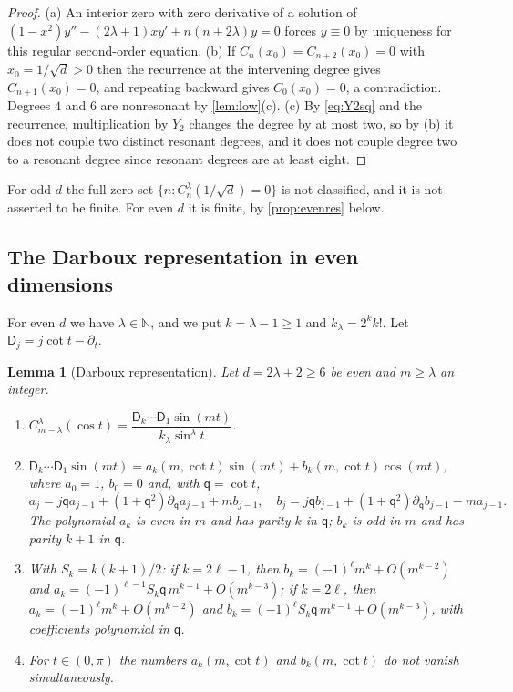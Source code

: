 \documentclass[11pt]{amsart}
\numberwithin{equation}{section}
\newtheorem{lemma}[theorem]{Lemma}
\theoremstyle{definition}
\theoremstyle{remark}
\newcommand{\N}{\mathbb{N}}
\begin{document}
\begin{proof}
(a) An interior zero with zero derivative of a solution of $(1-x^2)y''-(2\lambda+1)xy'+n(n+2\lambda)y=0$ forces $y\equiv0$ by uniqueness for this regular second-order equation. (b) If $C_n(x_0)=C_{n+2}(x_0)=0$ with $x_0=1/\sqrt d>0$ then the recurrence at the intervening degree gives $C_{n+1}(x_0)=0$, and repeating backward gives $C_0(x_0)=0$, a contradiction. Degrees $4$ and $6$ are nonresonant by \cref{lem:low}(c). (c) By \eqref{eq:Y2sq} and the recurrence, multiplication by $Y_2$ changes the degree by at most two, so by (b) it does not couple two distinct resonant degrees, and it does not couple degree two to a resonant degree since resonant degrees are at least eight.
\end{proof}

For odd $d$ the full zero set $\{n:C_n^\lambda(1/\sqrt d)=0\}$ is not classified, and it is not asserted to be finite. For even $d$ it is finite, by \cref{prop:evenres} below.

\subsection{The Darboux representation in even dimensions}
For even $d$ we have $\lambda\in\N$, and we put $k=\lambda-1\ge1$ and $k_\lambda=2^kk!$. Let $\mathsf D_j=j\cot t-\partial_t$.

\begin{lemma}[Darboux representation]\label{lem:darboux}
Let $d=2\lambda+2\ge6$ be even and $m\ge\lambda$ an integer.
\begin{enumerate}[label=\textup{(\alph*)}]
\item $C^\lambda_{m-\lambda}(\cos t)=\dfrac{\mathsf D_k\cdots\mathsf D_1\sin(mt)}{k_\lambda\sin^\lambda t}$.
\item $\mathsf D_k\cdots\mathsf D_1\sin(mt)=a_k(m,\cot t)\sin(mt)+b_k(m,\cot t)\cos(mt)$, where $a_0=1$, $b_0=0$ and, with $\mathsf q=\cot t$,
\begin{equation}\label{eq:abrec}
a_j=j\mathsf qa_{j-1}+(1+\mathsf q^2)\partial_{\mathsf q}a_{j-1}+mb_{j-1},\quad b_j=j\mathsf qb_{j-1}+(1+\mathsf q^2)\partial_{\mathsf q}b_{j-1}-ma_{j-1}.
\end{equation}
The polynomial $a_k$ is even in $m$ and has parity $k$ in $\mathsf q$; $b_k$ is odd in $m$ and has parity $k+1$ in $\mathsf q$.
\item With $S_k=k(k+1)/2$: if $k=2\ell-1$, then $b_k=(-1)^\ell m^k+O(m^{k-2})$ and $a_k=(-1)^{\ell-1}S_k\mathsf q\,m^{k-1}+O(m^{k-3})$; if $k=2\ell$, then $a_k=(-1)^\ell m^k+O(m^{k-2})$ and $b_k=(-1)^\ell S_k\mathsf q\,m^{k-1}+O(m^{k-3})$, with coefficients polynomial in $\mathsf q$.
\item For $t\in(0,\pi)$ the numbers $a_k(m,\cot t)$ and $b_k(m,\cot t)$ do not vanish simultaneously.
\end{enumerate}
\end{lemma}
\end{document}
